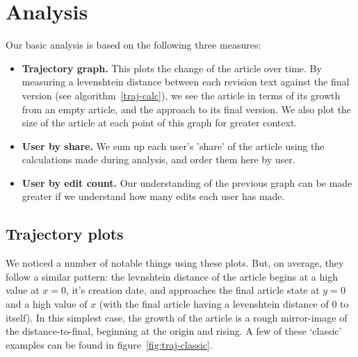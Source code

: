 \section{Analysis}
Our basic analysis is based on the following three measures:
\begin{itemize}[]
\item \textbf{Trajectory graph.} This plots the change of the article
  over time. By measuring a levenshtein distance between each revision
  text against the final version (see algorithm~\ref{traj-calc}), we
  see the article in terms of its growth from an empty article, and
  the approach to its final version. We also plot the size of the
  article at each point of this graph for greater context.
\item \textbf{User by share.} We sum up each user's 'share' of the
  article using the calculations made during analysis, and order them
  here by user.
\item \textbf{User by edit count.} Our understanding of the previous
  graph can be made greater if we understand how many edits each user
  has made.
\end{itemize}

\subsection*{Trajectory plots}
We noticed a number of notable things using these plots. But, on
average, they follow a similar pattern: the levnshtein distance of the
article begins at a high value at $x=0$, it's creation date, and
approaches the final article state at $y=0$ and a high value of $x$
(with the final article having a levenshtein distance of $0$ to
itself). In this simplest case, the growth of the article is a rough
mirror-image of the distance-to-final, beginning at the origin and
rising. A few of these `classic' examples can be found in
figure~\ref{fig:traj-classic}.

